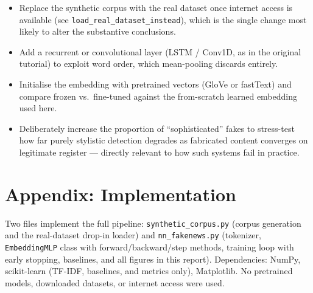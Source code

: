\documentclass[12pt]{article}
\begin{document}
\begin{itemize}[leftmargin=1.4em]
\item Replace the synthetic corpus with the real dataset once internet access is available (see \texttt{load\_real\_dataset\_instead}), which is the single change most likely to alter the substantive conclusions.
\item Add a recurrent or convolutional layer (LSTM / Conv1D, as in the original tutorial) to exploit word order, which mean-pooling discards entirely.
\item Initialise the embedding with pretrained vectors (GloVe or fastText) and compare frozen vs.\ fine-tuned against the from-scratch learned embedding used here.
\item Deliberately increase the proportion of ``sophisticated'' fakes to stress-test how far purely stylistic detection degrades as fabricated content converges on legitimate register --- directly relevant to how such systems fail in practice.
\end{itemize}

\section*{Appendix: Implementation}
Two files implement the full pipeline: \texttt{synthetic\_corpus.py} (corpus generation and the real-dataset drop-in loader) and \texttt{nn\_fakenews.py} (tokenizer, \texttt{EmbeddingMLP} class with forward/backward/step methods, training loop with early stopping, baselines, and all figures in this report). Dependencies: NumPy, scikit-learn (TF-IDF, baselines, and metrics only), Matplotlib. No pretrained models, downloaded datasets, or internet access were used.
\end{document}
